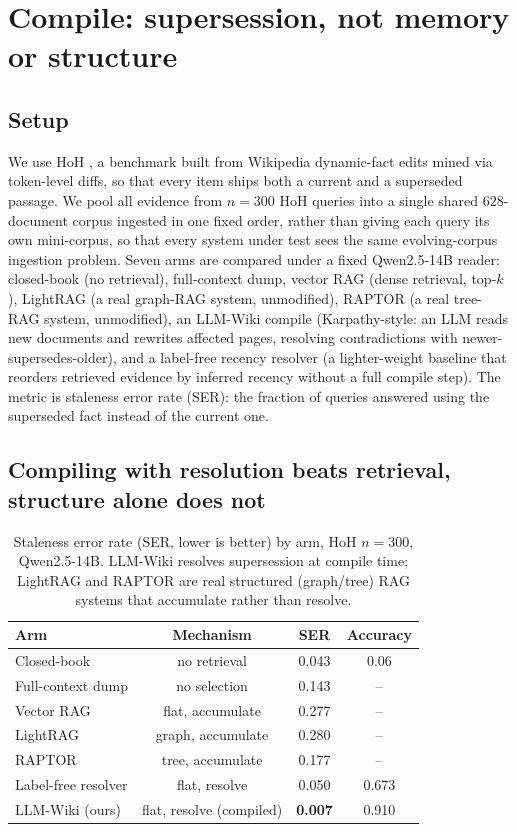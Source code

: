\section{Compile: supersession, not memory or structure}
\label{sec:compile}

\subsection{Setup}

We use HoH \citep{ouyang2025hoh}, a benchmark built from Wikipedia dynamic-fact edits mined via token-level diffs, so that every item ships both a current and a superseded passage. We pool all evidence from $n{=}300$ HoH queries into a single shared $628$-document corpus ingested in one fixed order, rather than giving each query its own mini-corpus, so that every system under test sees the same evolving-corpus ingestion problem. Seven arms are compared under a fixed Qwen2.5-14B reader: closed-book (no retrieval), full-context dump, vector RAG (dense retrieval, top-$k$), LightRAG \citep{guo2025lightrag} (a real graph-RAG system, unmodified), RAPTOR \citep{sarthi2024raptor} (a real tree-RAG system, unmodified), an LLM-Wiki compile (Karpathy-style: an LLM reads new documents and rewrites affected pages, resolving contradictions with newer-supersedes-older), and a label-free recency resolver (a lighter-weight baseline that reorders retrieved evidence by inferred recency without a full compile step). The metric is staleness error rate (SER): the fraction of queries answered using the superseded fact instead of the current one.

\subsection{Compiling with resolution beats retrieval, structure alone does not}

\begin{table}[t]
\centering
\small
\caption{Staleness error rate (SER, lower is better) by arm, HoH $n{=}300$, Qwen2.5-14B. LLM-Wiki resolves supersession at compile time; LightRAG and RAPTOR are real structured (graph/tree) RAG systems that accumulate rather than resolve.}
\label{tab:compile-arms}
\begin{tabular}{lccc}
\toprule
Arm & Mechanism & SER & Accuracy \\
\midrule
Closed-book & no retrieval & 0.043 & 0.06 \\
Full-context dump & no selection & 0.143 & -- \\
Vector RAG & flat, accumulate & 0.277 & -- \\
LightRAG \citep{guo2025lightrag} & graph, accumulate & 0.280 & -- \\
RAPTOR \citep{sarthi2024raptor} & tree, accumulate & 0.177 & -- \\
Label-free resolver & flat, resolve & 0.050 & 0.673 \\
LLM-Wiki (ours) & flat, resolve (compiled) & \textbf{0.007} & 0.910 \\
\bottomrule
\end{tabular}
\end{table}

